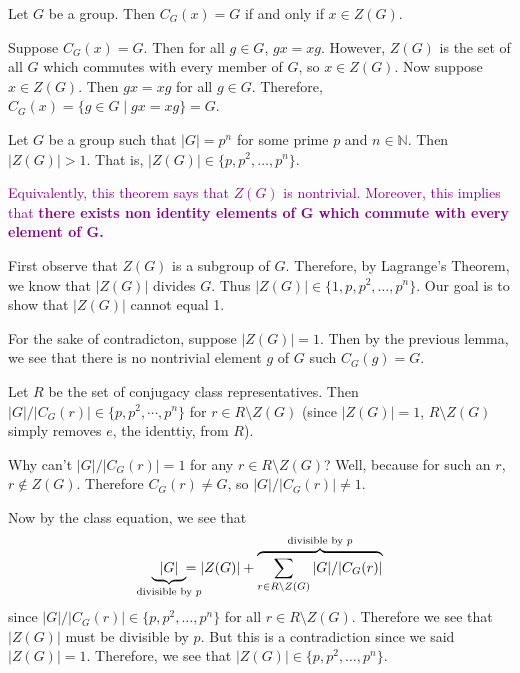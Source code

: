 \documentclass[12pt,letterpaper]{algebra_book}
\theoremstyle{definition}
\begin{document}
    \begin{lemma}
        Let $G$ be a group. Then $C_G(x) = G$ if and only if $x \in Z(G)$.
    \end{lemma}

    \begin{prf}
        Suppose $C_G(x) = G$. Then for all $g \in G$, $gx = xg$.
        However, $Z(G)$ is the set of all $G$ which commutes with
        every member of $G$, so $x \in Z(G)$. 
        Now suppose $x \in Z(G)$. Then $gx = xg$ for all $g \in G$.
        Therefore, $C_G(x) = \{g \in G \mid gx = xg\} = G$.
    \end{prf}

    \begin{thm} \label{center_lemma}
        Let $G$ be a group such that $|G| = p^n$ for some prime $p$
        and $n \in \mathbb{N}$. Then $|Z(G)| > 1$. That is, $|Z(G)|
        \in \{p, p^2, \dots, p^{n}\}$.
    \end{thm}
    \textcolor{Purple}{Equivalently, this theorem says that $Z(G)$ is nontrivial.
    Moreover, this implies that \textbf{there exists
    non identity elements of $\mathbf{G}$ which commute with every
    element of $\mathbf{G}$.}}

    \begin{prf}
        First observe that $Z(G)$ is a subgroup of $G$. Therefore, by
        Lagrange's Theorem, we know that $|Z(G)|$ divides $G$. Thus
        $|Z(G)| \in \{1, p, p^2, \dots, p^{n}\}$. Our goal is to show
        that $|Z(G)|$ cannot equal 1.

        \textcolor{NavyBlue}{For the sake of contradicton, suppose $|Z(G)| = 1$}. Then by
        the previous lemma, we see that 
        there is no nontrivial element $g$ of $G$ such $C_G(g) = G$.

        Let $R$ be the set of conjugacy class representatives. 
        Then $|G|/|C_G(r)| \in \{p, p^2, \cdots, p^n\}$ for $r \in
        R\setminus Z(G)$ (since $|Z(G)| = 1$, $R\setminus Z(G)$ simply
        removes $e$, the identtiy, from $R$).

        \textcolor{red!40!purple!100}{Why can't $|G|/|C_G(r)| = 1$ for any $r \in
        R\setminus Z(G)$? Well, because for such an $r$, $r \not\in
        Z(G)$. Therefore $C_G(r) \ne G$, so $|G|/|C_G(r)| \ne 1$.}

        Now by the class equation, we see that 
        \[
            \underbrace{ \hspace{.2cm}|G|\hspace{.2cm}   }_{\text{divisible by } p} \hspace{-.5cm} = |Z(G)| + \overbrace{\sum_{r \in R\setminus Z(G)} |G|/|C_G(r)|}^{\text{divisible by } p}
        \]
        since $|G|/|C_G(r)| \in \{p, p^2, \dots, p^n\}$ for all $r \in
        R\setminus Z(G)$. \textcolor{NavyBlue}{Therefore we see that $|Z(G)|$ must be
        divisible by $p$. But this is a contradiction since we said
        $|Z(G)| = 1$}. Therefore, we see that $|Z(G)| \in \{p, p^2,
        \dots, p^n\}$.
        
    \end{prf}
\end{document}
